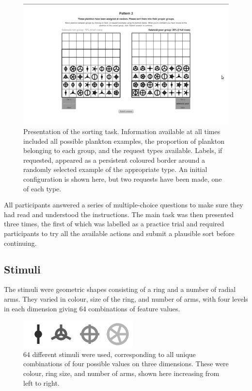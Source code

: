 \documentclass[10pt,letterpaper]{article}
\begin{document}
\begin{figure}[t] %
\includegraphics[width=.8\textwidth]{screenshot_bw.png}
\caption{Presentation of the sorting task. Information available at all times included all possible plankton examples, the proportion of plankton belonging to each group, and the request types available. Labels, if requested, appeared as a persistent coloured border around a randomly selected example of the appropriate type. An initial configuration is shown here, but two requests have been made, one of each type.}
\label{screenshot}
\end{figure}

All participants answered a series of multiple-choice questions to make sure they had read and understood the instructions. The main task was then presented three times, the first of which was labelled as a practice trial and required participants to try all the available actions and submit a plausible sort before continuing. 


\subsection{Stimuli}
The stimuli were geometric shapes consisting of a ring and a number of radial arms. They varied in colour, size of the ring, and number of arms, with four levels in each dimension giving 64 combinations of feature values.

\begin{figure}[t]
\centering
\includegraphics[width=.3\textwidth]{minstim_bw.png}
\caption{64 different stimuli were used, corresponding to all unique combinations of four possible values on three dimensions. These were colour, ring size, and number of arms, shown here increasing from left to right.}
\end{figure}
\end{document}
